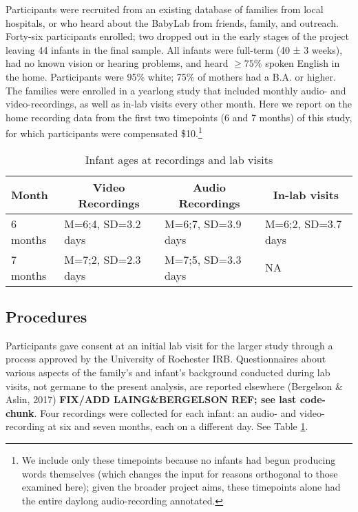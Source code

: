\documentclass[floatsintext,man]{apa6}
\theoremstyle{definition}
\theoremstyle{definition}
\theoremstyle{definition}
\theoremstyle{remark}
\begin{document}
Participants were recruited from an existing database of families from
local hospitals, or who heard about the BabyLab from friends, family,
and outreach. Forty-six participants enrolled; two dropped out in the
early stages of the project leaving 44 infants in the final sample. All
infants were full-term (40 ± 3 weeks), had no known vision or hearing
problems, and heard \(\geq 75\%\) spoken English in the home.
Participants were 95\% white; 75\% of mothers had a B.A. or higher. The
families were enrolled in a yearlong study that included monthly audio-
and video-recordings, as well as in-lab visits every other month. Here
we report on the home recording data from the first two timepoints (6
and 7 months) of this study, for which participants were compensated
\$10.\footnote{We include only these timepoints because no infants had begun producing words themselves (which changes the input for reasons orthogonal to those examined here); given the broader project aims, these timepoints alone had the entire daylong audio-recording annotated.}

\begin{table}[tbp]
\begin{center}
\begin{threeparttable}
\caption{\label{tab:recording-ages-table}Infant ages at recordings and lab visits}
\begin{tabular}{llll}
\toprule
Month & \multicolumn{1}{c}{Video Recordings} & \multicolumn{1}{c}{Audio Recordings} & \multicolumn{1}{c}{In-lab visits}\\
\midrule
6 months & M=6;4, SD=3.2 days & M=6;7, SD=3.9 days & M=6;2, SD=3.7 days\\
7 months & M=7;2, SD=2.3 days & M=7;5, SD=3.3 days & NA\\
\bottomrule
\end{tabular}
\end{threeparttable}
\end{center}
\end{table}

\subsection{Procedures}\label{procedures}

Participants gave consent at an initial lab visit for the larger study
through a process approved by the University of Rochester IRB.
Questionnaires about various aspects of the family's and infant's
background conducted during lab visits, not germane to the present
analysis, are reported elsewhere (Bergelson \& Aslin, 2017)
\textbf{FIX/ADD LAING\&BERGELSON REF; see last code-chunk}. Four
recordings were collected for each infant: an audio- and video-recording
at six and seven months, each on a different day. See Table
\ref{tab:recording-ages-table}.
\end{document}
